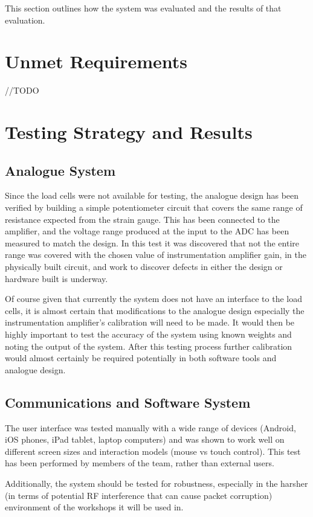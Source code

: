 This section outlines how the system was evaluated and the results of that evaluation.

\section{Unmet Requirements}
//TODO

\section{Testing Strategy and Results}

\subsection{Analogue System}
Since the load cells were not available for testing, the analogue design has been verified by building a simple potentiometer circuit that covers the same range of resistance expected from the strain gauge. This has been connected to the amplifier, and the voltage range produced at the input to the ADC has been measured to match the design. In this test it was discovered that not the entire range was covered with the chosen value of instrumentation amplifier gain, in the physically built circuit, and work to discover defects in either the design or hardware built is underway.

Of course given that currently the system does not have an interface to the load cells, it is almost certain that modifications to the analogue design especially the instrumentation amplifier's calibration will need to be made. It would then be highly important to test the accuracy of the system using known weights and noting the output of the system. After this testing process further calibration would almost certainly be required potentially in both software tools and analogue design. 

\subsection{Communications and Software System}
The user interface was tested manually with a wide range of devices (Android, iOS phones, iPad tablet, laptop computers) and was shown to work well on different screen sizes and interaction models (mouse vs touch control). This test has been performed by members of the team, rather than external users.

Additionally, the system should be tested for robustness, especially in the harsher (in terms of potential RF interference that can cause packet corruption) environment of the workshops it will be used in.

